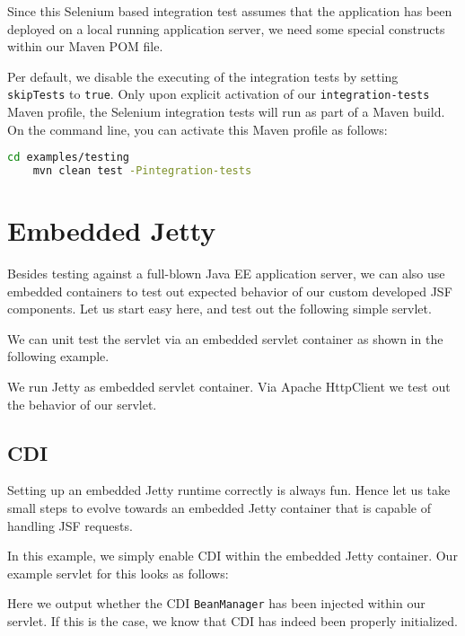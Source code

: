 Since this Selenium based integration test assumes that the application has been deployed on a local running application server, we need some special constructs within our Maven POM file.

Per default, we disable the executing of the integration tests by setting \texttt{skipTests} to \texttt{true}.
Only upon explicit activation of our \texttt{integration-tests} Maven profile,
the Selenium integration tests will run as part of a Maven build.
On the command line, you can activate this Maven profile as follows:
\begin{lstlisting}[language=bash]
	cd examples/testing
	mvn clean test -Pintegration-tests
\end{lstlisting}


\section{Embedded Jetty}
Besides testing against a full-blown Java EE application server, we can also use embedded containers to test out expected behavior of our custom developed JSF components.
Let us start easy here, and test out the following simple servlet.


We can unit test the servlet via an embedded servlet container as shown in the following example.

We run Jetty \cite{jetty} as embedded servlet container.
Via Apache HttpClient \cite{httpclient} we test out the behavior of our servlet.

\subsection{CDI}
Setting up an embedded Jetty runtime correctly is always fun.
Hence let us take small steps to evolve towards an embedded Jetty container that is capable of handling JSF requests.

In this example, we simply enable CDI within the embedded Jetty container.
Our example servlet for this looks as follows:

Here we output whether the CDI \texttt{BeanManager} has been injected within our servlet.
If this is the case, we know that CDI has indeed been properly initialized.

